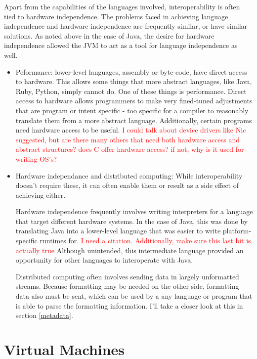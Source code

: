 \documentclass{sig-alternate}
\newcommand{\mycomment}[1]{\textcolor{red}{#1}}
\begin{document}
Apart from the capabilities of the languages involved, interoperability is often tied to hardware independence. The problems faced in achieving language independence and hardware independence are frequently similar, or have similar solutions. As noted above in the case of Java, the desire for hardware independence allowed the JVM to act as a tool for language independence as well.

\begin{itemize}

	
	\item Peformance: lower-level languages, assembly or byte-code, have direct access to hardware. This allows some things that more abstract languages, like Java, Ruby, Python, simply cannot do. One of these things is performance. Direct access to hardware allows programmers to make very fined-tuned adjustments that are program or intent specific - too specific for a compiler to reasonably translate them from a more abstract language. 
	Additionally, certain programs need hardware access to be useful. \mycomment{I could talk about device drivers like Nic suggested, but are there many others that need both hardware access and abstract structures?}
	\mycomment{does C offer hardware access? if not, why is it used for writing OS's?}
		
	\item Hardware independance and distributed computing: While interoperability doesn't require these, it can often enable them or result as a side effect of achieving either.
	
	Hardware independence frequently involves writing interpreters for a language that target different hardware systems. In the case of Java, this was done by translating Java into a lower-level language that was easier to write platform-specific runtimes for.
	\mycomment{I need a citation. Additionally, make sure this last bit is actually true}
	Although unintended, this intermediate language provided an opportunity for other languages to interoperate with Java.	
	
	Distributed computing often involves sending data in largely unformatted streams. Because formatting may be needed on the other side, formatting data also must be sent, which can be used by a any language or program that is able to parse the formatting information. I'll take a closer look at this in section \ref{metadata}.
\end{itemize}


\section{Virtual Machines}\label{VM}
\end{document}

